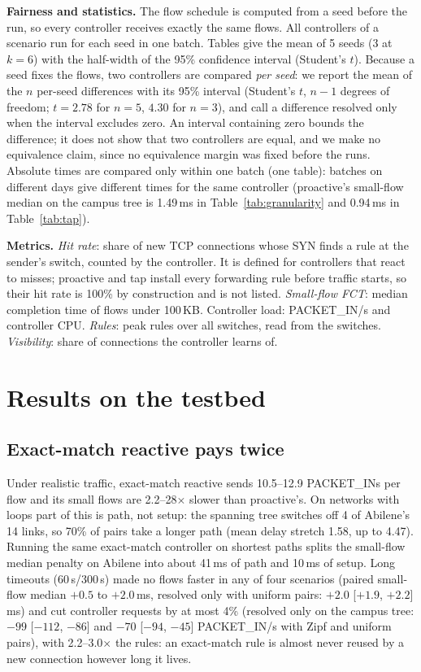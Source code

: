 \documentclass[conference]{IEEEtran}
\begin{document}
\textbf{Fairness and statistics.} The flow schedule is computed from a seed before the run, so every controller receives exactly the same flows. All controllers of a scenario run for each seed in one batch. Tables give the mean of 5 seeds (3 at $k{=}6$) with the half-width of the 95\% confidence interval (Student's $t$). Because a seed fixes the flows, two controllers are compared \emph{per seed}: we report the mean of the $n$ per-seed differences with its 95\% interval (Student's $t$, $n{-}1$ degrees of freedom; $t{=}2.78$ for $n{=}5$, $4.30$ for $n{=}3$), and call a difference resolved only when the interval excludes zero. An interval containing zero bounds the difference; it does not show that two controllers are equal, and we make no equivalence claim, since no equivalence margin was fixed before the runs. Absolute times are compared only within one batch (one table): batches on different days give different times for the same controller (proactive's small-flow median on the campus tree is 1.49\,ms in Table~\ref{tab:granularity} and 0.94\,ms in Table~\ref{tab:tap}).

\textbf{Metrics.} \emph{Hit rate}: share of new TCP connections whose SYN finds a rule at the sender's switch, counted by the controller. It is defined for controllers that react to misses; proactive and tap install every forwarding rule before traffic starts, so their hit rate is 100\% by construction and is not listed. \emph{Small-flow FCT}: median completion time of flows under 100\,KB. Controller load: PACKET\_IN/s and controller CPU. \emph{Rules}: peak rules over all switches, read from the switches. \emph{Visibility}: share of connections the controller learns of.

\section{Results on the testbed}\label{sec:granularity}

\subsection{Exact-match reactive pays twice}
Under realistic traffic, exact-match reactive sends 10.5--12.9 PACKET\_INs per flow and its small flows are 2.2--28$\times$ slower than proactive's. On networks with loops part of this is path, not setup: the spanning tree switches off 4 of Abilene's 14 links, so 70\% of pairs take a longer path (mean delay stretch 1.58, up to 4.47). Running the same exact-match controller on shortest paths splits the small-flow median penalty on Abilene into about 41\,ms of path and 10\,ms of setup. Long timeouts (60\,s/300\,s) made no flows faster in any of four scenarios (paired small-flow median $+0.5$ to $+2.0$\,ms, resolved only with uniform pairs: $+2.0$ [$+1.9$, $+2.2$]\,ms) and cut controller requests by at most 4\% (resolved only on the campus tree: $-99$ [$-112$, $-86$] and $-70$ [$-94$, $-45$] PACKET\_IN/s with Zipf and uniform pairs), with 2.2--3.0$\times$ the rules: an exact-match rule is almost never reused by a new connection however long it lives.
\end{document}
